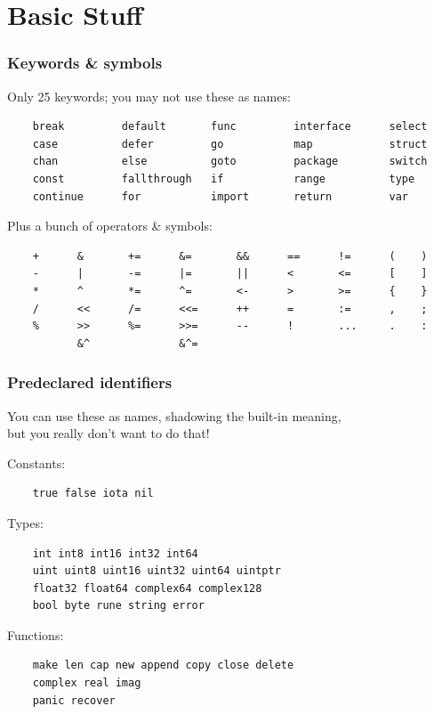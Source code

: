 \documentclass[handout,compress,t,11pt]{beamer}
\begin{document}
\section{Basic Stuff}
\begin{frame}[fragile]
    \frametitle{Keywords \& symbols}
    Only 25 keywords; you may not use these as names:
{\scriptsize\begin{verbatim}
    break         default       func         interface      select
    case          defer         go           map            struct
    chan          else          goto         package        switch
    const         fallthrough   if           range          type
    continue      for           import       return         var
\end{verbatim}}
    \vspace{\baselineskip}
    Plus a bunch of operators \& symbols:
{\scriptsize\begin{verbatim}
    +      &       +=      &=       &&      ==      !=      (    )
    -      |       -=      |=       ||      <       <=      [    ]
    *      ^       *=      ^=       <-      >       >=      {    }
    /      <<      /=      <<=      ++      =       :=      ,    ;
    %      >>      %=      >>=      --      !       ...     .    :
           &^              &^=                            
\end{verbatim}}
\end{frame}
\begin{frame}[fragile]
    \frametitle{Predeclared identifiers}
    You can use these as names, shadowing the built-in meaning,\\
    but you really don't want to do that! \par
    \vspace{0.5\baselineskip}
    Constants:
{\scriptsize\begin{verbatim}
    true false iota nil
\end{verbatim}}
    \vspace{0.25\baselineskip}
    Types:
{\scriptsize\begin{verbatim}
    int int8 int16 int32 int64
    uint uint8 uint16 uint32 uint64 uintptr 
    float32 float64 complex64 complex128
    bool byte rune string error
\end{verbatim}}
    \vspace{0.25\baselineskip}
    Functions:
{\scriptsize\begin{verbatim}
    make len cap new append copy close delete 
    complex real imag 
    panic recover
\end{verbatim}}
\end{frame}
\end{document}
